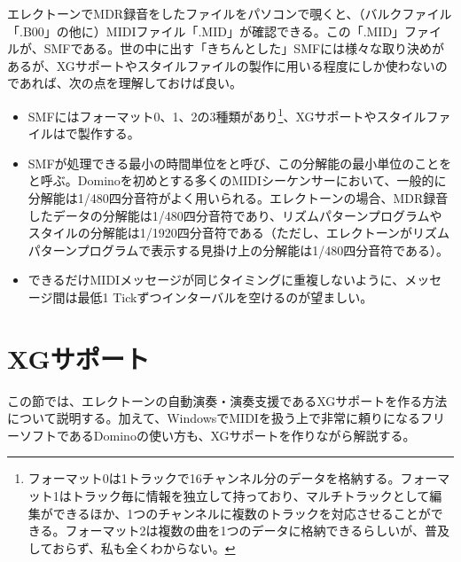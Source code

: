 \documentclass[uplatex, 10pt, dvipdfmx]{jsarticle}
\numberwithin{equation}{section}
\newcommand{\emphj}[1]{\textbf{\textrm{\textgt{{#1}}}}}
\begin{document}
エレクトーンでMDR録音をしたファイルをパソコンで覗くと、（バルクファイル「.B00」の他に）MIDIファイル「.MID」が確認できる。この「.MID」ファイルが、SMFである。世の中に出す「きちんとした」SMFには様々な取り決めがあるが、XGサポートやスタイルファイルの製作に用いる程度にしか使わないのであれば、次の点を理解しておけば良い。
\begin{itemize}
\item SMFにはフォーマット0、1、2の3種類があり\footnote{フォーマット0は1トラックで16チャンネル分のデータを格納する。フォーマット1はトラック毎に情報を独立して持っており、マルチトラックとして編集ができるほか、1つのチャンネルに複数のトラックを対応させることができる。フォーマット2は複数の曲を1つのデータに格納できるらしいが、普及しておらず、私も全くわからない。}、XGサポートやスタイルファイルは\emphj{フォーマット0}で製作する。
\item SMFが処理できる最小の時間単位を\emphj{分解能}と呼び、この分解能の最小単位のことを\emphj{Tick}と呼ぶ。Dominoを初めとする多くのMIDIシーケンサーにおいて、一般的に分解能は1/480四分音符がよく用いられる。エレクトーンの場合、MDR録音したデータの分解能は1/480四分音符であり、リズムパターンプログラムやスタイルの分解能は1/1920四分音符である（ただし、エレクトーンがリズムパターンプログラムで表示する見掛け上の分解能は1/480四分音符である）\footnotemark 。
\item できるだけMIDIメッセージが同じタイミングに重複しないように、メッセージ間は最低1 Tickずつインターバルを空けるのが望ましい。
\end{itemize}

\clearpage

\section{XGサポート}
この節では、エレクトーンの自動演奏・演奏支援であるXGサポートを作る方法について説明する。加えて、WindowsでMIDIを扱う上で非常に頼りになるフリーソフトであるDominoの使い方も、XGサポートを作りながら解説する。
\end{document}
